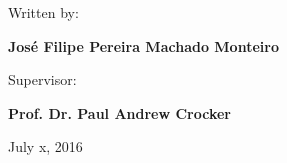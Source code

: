 \vspace{0.5cm}
\begin{center}
\begin{normalsize}
\begin{large}
Written by:
\end{large}
\end{normalsize}
\end{center}

\vspace{0.2cm}
\begin{center}
\begin{large}
\textbf{José Filipe Pereira Machado Monteiro}
\end{large}
\end{center}

\vspace{0,5cm}
\begin{center}
\begin{normalsize}
\begin{large}
Supervisor:
\end{large}
\end{normalsize}
\end{center}

\vspace{0.2cm}
\begin{center}
\begin{large}
\textbf{Prof. Dr. Paul Andrew Crocker}
\end{large}
\end{center}



\vspace{0.5cm}
\begin{center}
\begin{normalsize}
July x, 2016
\end{normalsize}
\end{center}
